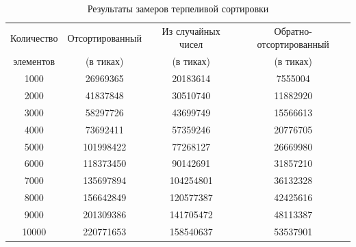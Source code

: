 \documentclass[a4paper, 14pt]{article}
\begin{document}
     \begin{table}[h]
        \caption{Результаты замеров терпеливой сортировки}
            \begin{tabular}{ | c | c | c | c | }
                \hline
                 Количество   &  Отсортированный   &  Из случайных чисел  &  Обратно-отсортированный \\
                 элементов &  (в тиках) & (в тиках) & (в тиках) \\ \hline  
                     1000 &    26969365  &    20183614   &     7555004  \\
                    2000 &    41837848  &    30510740   &     11882920 \\
                    3000 &    58297726  &    43699749   &     15566613 \\
                    4000 &    73692411  &    57359246   &     20776705 \\
                    5000 &    101998422 &    77268127   &     26669980 \\
                    6000 &    118373450 &    90142691   &     31857210 \\
                    7000 &    135697894 &    104254801  &     36132328 \\
                    8000 &    156642849 &    120577387  &     42425616 \\
                    9000 &    201309386 &    141705472  &     48113387 \\
                    10000&    220771653 &     158540637 &     53537901 \\
                \hline
            \end{tabular}
        \label{tab:parti_sort}
    \end{table}
\end{document}
